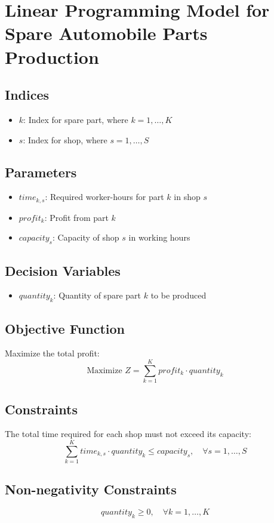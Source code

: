 \documentclass{article}
\begin{document}
\section*{Linear Programming Model for Spare Automobile Parts Production}

\subsection*{Indices}
\begin{itemize}
    \item $k$: Index for spare part, where $k = 1, \ldots, K$
    \item $s$: Index for shop, where $s = 1, \ldots, S$
\end{itemize}

\subsection*{Parameters}
\begin{itemize}
    \item $time_{k, s}$: Required worker-hours for part $k$ in shop $s$
    \item $profit_{k}$: Profit from part $k$
    \item $capacity_{s}$: Capacity of shop $s$ in working hours
\end{itemize}

\subsection*{Decision Variables}
\begin{itemize}
    \item $quantity_{k}$: Quantity of spare part $k$ to be produced
\end{itemize}

\subsection*{Objective Function}
Maximize the total profit:
\[
\text{Maximize } Z = \sum_{k=1}^{K} profit_{k} \cdot quantity_{k}
\]

\subsection*{Constraints}
The total time required for each shop must not exceed its capacity:
\[
\sum_{k=1}^{K} time_{k, s} \cdot quantity_{k} \leq capacity_{s}, \quad \forall s = 1, \ldots, S
\]

\subsection*{Non-negativity Constraints}
\[
quantity_{k} \geq 0, \quad \forall k = 1, \ldots, K
\]
\end{document}
